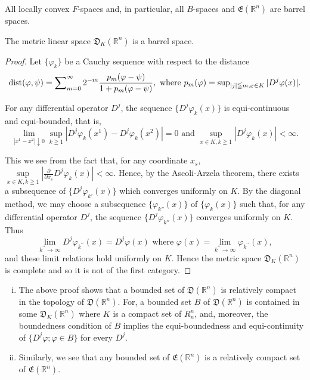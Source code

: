 \begin{corollary}\label{cor:AV.2.Corollary.1} All locally convex $F$-spaces and, in particular, all $B$-spaces and $\mathfrak{E}(\mathbb{R}^{n})$ are barrel spaces. 
\end{corollary}

\begin{corollary}\label{cor:AV.2.Corollary.2} The metric linear space $\mathfrak{D}_K(\mathbb{R}^{n})$ is a barrel space. 
\end{corollary}

\begin{proof}
 Let $\{\varphi_{k}\}$ be a Cauchy sequence with respect to the distance 
\[
\operatorname{dist} (\varphi , \psi) = \sum\nolimits_{m=0} ^{\infty} 2 ^{-m} \frac {p _{m} (\varphi - \psi)}{1 + p _{m} (\varphi - \psi)}, \text{ where } p _{m} (\varphi) = \sup\nolimits _{| j | \leqq m, x \in K} | D ^{j} \varphi (x) |. \]

For any differential operator $D^{j}$, the sequence $\{D^{j}\varphi_{k}(x)\}$ is equi-continuous and equi-bounded, that is, 
\[
\lim\limits _ {| x ^{1} - x ^{2} | \downarrow 0} \sup\limits _{k \geqq 1} \left| D ^{j} \varphi_{k} (x ^{1}) - D ^{j} \varphi_{k} (x ^{2}) \right| = 0 \text{ and } \sup\limits _{x \in K, k \geqq 1} \left| D ^{j} \varphi_{k} (x) \right| < \infty .
\]

This we see from the fact that, for any coordinate $x_s$, $\sup\limits_{x \in K, k \geqq 1} \left| \frac{\partial}{\partial x_s} D^j \varphi_k(x) \right| < \infty$. Hence, by the Ascoli-Arzela theorem, there exists a subsequence of $\{D^j \varphi_{k'}(x)\}$ which converges uniformly on $K$. By the diagonal method, we may choose a subsequence $\{\varphi_{k''}(x)\}$ of $\{\varphi_k(x)\}$ such that, for any differential operator $D^j$, the sequence $\{D^j \varphi_{k''}(x)\}$ converges uniformly on $K$. Thus 
\[
\lim\limits _ {k ^{\prime \prime} \rightarrow \infty} D ^{j} \varphi_ {k ^{\prime \prime}} (x) = D ^{j} \varphi (x) \text{ where } \varphi (x) = \lim\limits _ {k ^{\prime \prime} \rightarrow \infty} \varphi_ {k ^{\prime \prime}} (x),
\]
and these limit relations hold uniformly on $K$. Hence the metric space $\mathfrak{D}_K(\mathbb{R}^{n})$ is complete and so it is not of the first category. 
\end{proof}

\begin{remarku} \begin{enumerate}[(i)]
\item The above proof shows that a bounded set of $\mathfrak{D}(\mathbb{R}^{n})$ is relatively compact in the topology of $\mathfrak{D}(\mathbb{R}^{n})$. For, a bounded set $B$ of $\mathfrak{D}(\mathbb{R}^{n})$ is contained in some $\mathfrak{D}_K(\mathbb{R}^{n})$ where $K$ is a compact set of $R_n^n$, and, moreover, the boundedness condition of $B$ implies the equi-boundedness and equi-continuity of $\{D^j\varphi; \varphi \in B\}$ for every $D^j$.
\item Similarly, we see that any bounded set of $\mathfrak{E}(\mathbb{R}^{n})$ is a relatively compact set of $\mathfrak{E}(\mathbb{R}^{n})$.
\end{enumerate}
\end{remarku}

